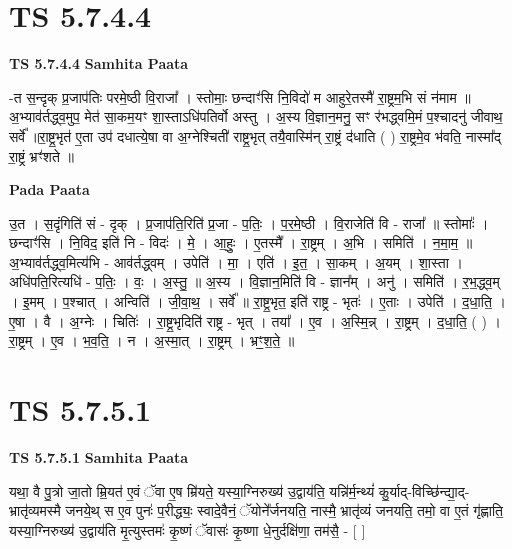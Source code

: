 \documentclass[17pt]{extarticle}
\begin{document}

\section{ TS 5.7.4.4 }

\textbf{TS 5.7.4.4 } \newline
\textbf{Samhita Paata} \newline

-त स॒न्दृक् प्र॒जाप॑तिः परमे॒ष्ठी वि॒राजा᳚ । स्तोमाः॒ छन्दाꣳ॑सि नि॒विदो॑ म आहुरे॒तस्मै॑ रा॒ष्ट्रम॒भि सं न॑माम ॥अ॒भ्याव॑र्तद्ध्व॒मुप॒ मेत॑ सा॒कम॒यꣳ शा॒स्ताऽधि॑पतिर्वो अस्तु । अ॒स्य वि॒ज्ञान॒मनु॒ सꣳ र॑भद्ध्वमि॒मं प॒श्चादनु॑ जीवाथ॒ सर्वे᳚ ॥रा॒ष्ट्र॒भृत॑ ए॒ता उप॑ दधात्ये॒षा वा अ॒ग्नेश्चिती॑ राष्ट्र॒भृत् तयै॒वास्मि॑न् रा॒ष्ट्रं द॑धाति ( ) रा॒ष्ट्रमे॒व भ॑वति॒ नास्मा᳚द् रा॒ष्ट्रं भ्रꣳ॑शते ॥ \newline

\textbf{Pada Paata} \newline

उ॒त । स॒दृंगिति॑ सं - दृक् । प्र॒जाप॑ति॒रिति॑ प्र॒जा - प॒तिः॒ । प॒र॒मे॒ष्ठी । वि॒राजेति॑ वि - राजा᳚ ॥ स्तोमाः᳚ । छन्दाꣳ॑सि । नि॒विद॒ इति॑ नि - विदः॑ । मे॒ । आ॒हुः॒ । ए॒तस्मै᳚ । रा॒ष्ट्रम् । अ॒भि । समिति॑ । न॒मा॒म॒ ॥ अ॒भ्याव॑र्तद्ध्व॒मित्य॑भि - आव॑र्तद्ध्वम् । उपेति॑ । मा॒ । एति॑ । इ॒त॒ । सा॒कम् । अ॒यम् । शा॒स्ता । अधि॑पति॒रित्यधि॑ - प॒तिः॒ । वः॒ । अ॒स्तु॒ ॥ अ॒स्य । वि॒ज्ञान॒मिति॑ वि - ज्ञान᳚म् । अनु॑ । समिति॑ । र॒भ॒द्ध्व॒म् । इ॒मम् । प॒श्चात् । अन्विति॑ । जी॒वा॒थ॒ । सर्वे᳚ ॥ रा॒ष्ट्र॒भृत॒ इति॑ राष्ट्र - भृतः॑ । ए॒ताः । उपेति॑ । द॒धा॒ति॒ । ए॒षा । वै । अ॒ग्नेः । चितिः॑ । रा॒ष्ट्र॒भृदिति॑ राष्ट्र - भृत् । तया᳚ । ए॒व । अ॒स्मि॒न्न् । रा॒ष्ट्रम् । द॒धा॒ति॒ ( ) । रा॒ष्ट्रम् । ए॒व । भ॒व॒ति॒ । न । अ॒स्मा॒त् । रा॒ष्ट्रम् । भ्रꣳ॒॒श॒ते॒ ॥  \newline





\section{ TS 5.7.5.1 }

\textbf{TS 5.7.5.1 } \newline
\textbf{Samhita Paata} \newline

यथा॒ वै पु॒त्रो जा॒तो म्रि॒यत॑ ए॒वं ॅवा ए॒ष म्रि॑यते॒ यस्या॒ग्निरुख्य॑ उ॒द्वाय॑ति॒ यन्नि॑र्म॒न्थ्यं॑ कु॒र्याद्-विच्छि॑न्द्या॒द्-भ्रातृ॑व्यमस्मै जनये॒थ् स ए॒व पुनः॑ प॒रीद्ध्यः॒ स्वादे॒वैनं॒ ॅयोने᳚र्जनयति॒ नास्मै॒ भ्रातृ॑व्यं जनयति॒ तमो॒ वा ए॒तं गृ॑ह्णाति॒ यस्या॒ग्निरुख्य॑ उ॒द्वाय॑ति मृ॒त्युस्तमः॑ कृ॒ष्णं ॅवासः॑ कृ॒ष्णा धे॒नुर्दक्षि॑णा॒ तम॑सै॒ - [  ] \newline
\end{document}
